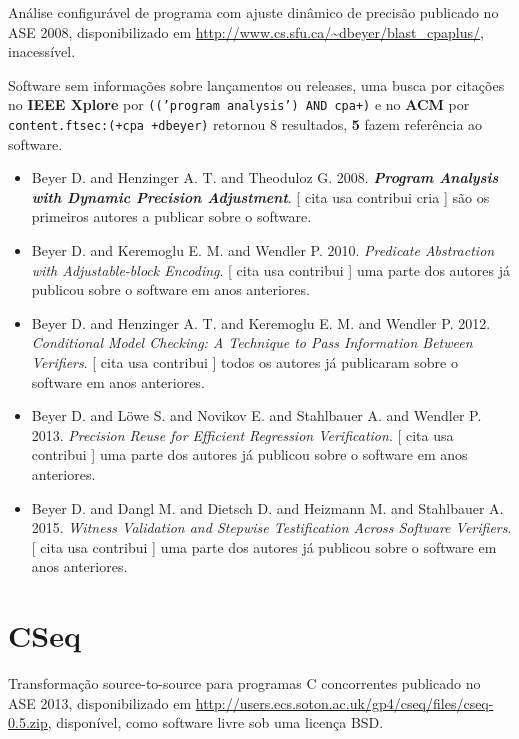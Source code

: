 Análise configurável de programa com ajuste dinâmico de precisão
publicado no ASE 2008,
disponibilizado em \url{http://www.cs.sfu.ca/~dbeyer/blast_cpaplus/},
inacessível.

Software sem informações sobre lançamentos ou releases,
uma busca por citações no {\bf IEEE Xplore} por
\texttt{(('program analysis') AND cpa+)}
e no {\bf ACM} por
\texttt{content.ftsec:(+cpa +dbeyer)}
retornou
8 resultados,
{\bf 5} fazem referência ao software.

\begin{itemize}
\item Beyer D. and Henzinger A. T. and Theoduloz G.
      2008.
        \textbf{\textit{ Program Analysis with Dynamic Precision Adjustment}}.
      [
          cita
          usa
          contribui
          cria
      ]
são os primeiros autores a publicar sobre o software.
\item Beyer D. and Keremoglu E. M. and Wendler P.
      2010.
        \textit{ Predicate Abstraction with Adjustable-block Encoding}.
      [
          cita
          usa
          contribui
      ]
uma parte dos autores já publicou sobre o software em anos anteriores.
\item Beyer D. and Henzinger A. T. and Keremoglu E. M. and Wendler P.
      2012.
        \textit{ Conditional Model Checking: A Technique to Pass Information Between Verifiers}.
      [
          cita
          usa
          contribui
      ]
todos os autores já publicaram sobre o software em anos anteriores.
\item Beyer D. and L\"{o}we S. and Novikov E. and Stahlbauer A. and Wendler P.
      2013.
        \textit{ Precision Reuse for Efficient Regression Verification}.
      [
          cita
          usa
          contribui
      ]
uma parte dos autores já publicou sobre o software em anos anteriores.
\item Beyer D. and Dangl M. and Dietsch D. and Heizmann M. and Stahlbauer A.
      2015.
        \textit{ Witness Validation and Stepwise Testification Across Software Verifiers}.
      [
          cita
          usa
          contribui
      ]
uma parte dos autores já publicou sobre o software em anos anteriores.
\end{itemize}
\section{CSeq}

Transformação source-to-source para programas C concorrentes
publicado no ASE 2013,
disponibilizado em \url{http://users.ecs.soton.ac.uk/gp4/cseq/files/cseq-0.5.zip},
disponível,
como software livre
sob uma licença BSD.

